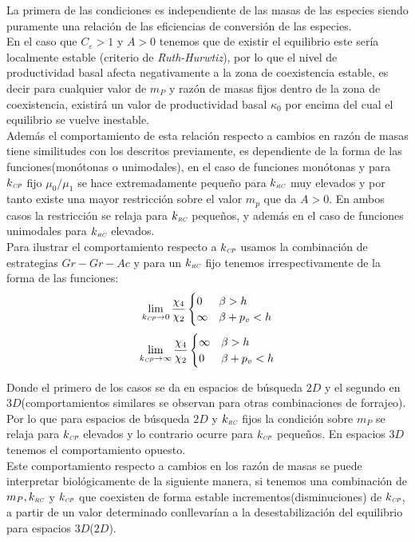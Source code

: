 La primera de las condiciones es independiente de las masas de las especies siendo puramente una relaci\'on de las eficiencias de conversi\'on de las especies. \\
En el caso que $C_\varepsilon > 1 $ y $ A  > 0$ tenemos que de existir el equilibrio este ser\'ia localmente estable (criterio de \emph{Ruth-Hurwtiz}), por lo que el nivel de productividad basal afecta negativamente a la zona de coexistencia estable, es decir para cualquier valor de $m_P$ y raz\'on de masas fijos dentro de la zona de coexistencia, existir\'a un valor de productividad basal $\kappa_0$ por encima del cual el equilibrio se vuelve inestable.\\
Adem\'as el comportamiento de esta relaci\'on respecto a cambios en raz\'on de masas tiene similitudes con los descritos previamente, es dependiente de la forma de las funciones(mon\'otonas o unimodales), en el caso de funciones mon\'otonas y para $k_{\textit{\tiny CP}}$ fijo $\mu_0/\mu_1$ se hace extremadamente peque\~no para $k_{\textit{\tiny RC}}$ muy elevados y por tanto existe una mayor restricci\'on sobre el valor $m_p$ que da $A>0$. En ambos casos la restricci\'on se relaja para $k_{\textit{\tiny RC}}$ peque\~nos, y adem\'as en el caso de funciones unimodales para $k_{\textit{\tiny RC}}$ elevados.\\
Para ilustrar el comportamiento respecto a $k_{\textit{\tiny CP}}$ usamos la combinaci\'on de estrategias $Gr-Gr-Ac$ y para un $k_{\textit{\tiny RC}}$ fijo tenemos irrespectivamente de la forma de las funciones:
\begin{equation}
  \lim_{k_{\textit{\tiny CP}} \to 0} \frac{\chi_4}{\chi_2} 
  \begin{cases}
     0 & \beta > h \\
     \infty & \beta + p_v < h\\ 
  \end{cases}
\end{equation}
\begin{equation}
  \lim_{k_{\textit{\tiny CP}} \to \infty} \frac{\chi_4}{\chi_2}
  \begin{cases}
    \infty & \beta > h\\ 
    0 & \beta + p_v < h\\
    \end{cases}
\end{equation}

Donde el primero de los casos se da en espacios de b\'usqueda $2D$ y el segundo en $3D$(comportamientos similares se observan para otras combinaciones de forrajeo). Por lo que para espacios de b\'usqueda $2D$ y $k_{\textit{\tiny RC}}$ fijos la condici\'on sobre $m_P$ se relaja para $k_{\textit{\tiny CP}}$ elevados y lo contrario ocurre para $k_{\textit{\tiny CP}}$ peque\~nos. En espacios $3D$ tenemos el comportamiento opuesto.\\
Este comportamiento respecto a cambios en los raz\'on de masas se puede interpretar biol\'ogicamente de la siguiente manera, si tenemos una combinaci\'on de $m_P,k_{\textit{\tiny RC}}$ y $k_{\textit{\tiny CP}}$ que coexisten de forma estable incrementos(disminuciones) de $k_{\textit{\tiny CP}}$, a partir de un valor determinado conllevar\'ian a la desestabilizaci\'on del equilibrio para espacios $3D$($2D$).\\

